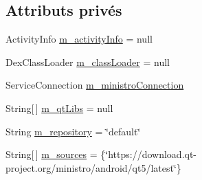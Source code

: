 \subsection*{Attributs privés}
\begin{DoxyCompactItemize}
\item 
Activity\-Info \hyperlink{classorg_1_1qtproject_1_1qt5_1_1android_1_1bindings_1_1_qt_activity_ab82e3c0917844afbd0559863f78137bf}{m\-\_\-activity\-Info} = null
\item 
Dex\-Class\-Loader \hyperlink{classorg_1_1qtproject_1_1qt5_1_1android_1_1bindings_1_1_qt_activity_a061ee56178d4d7ab6da01d7cf187e33b}{m\-\_\-class\-Loader} = null
\item 
Service\-Connection \hyperlink{classorg_1_1qtproject_1_1qt5_1_1android_1_1bindings_1_1_qt_activity_a26f7868b5d490d58265090a167e66436}{m\-\_\-ministro\-Connection}
\item 
String\mbox{[}$\,$\mbox{]} \hyperlink{classorg_1_1qtproject_1_1qt5_1_1android_1_1bindings_1_1_qt_activity_a18de4caf09f5386072f13afc426f2bce}{m\-\_\-qt\-Libs} = null
\item 
String \hyperlink{classorg_1_1qtproject_1_1qt5_1_1android_1_1bindings_1_1_qt_activity_a45d1a455c3855079063f6457a9dffb82}{m\-\_\-repository} = \char`\"{}default\char`\"{}
\item 
String\mbox{[}$\,$\mbox{]} \hyperlink{classorg_1_1qtproject_1_1qt5_1_1android_1_1bindings_1_1_qt_activity_a9cb36331162103703e5861eae9ce2caa}{m\-\_\-sources} = \{\char`\"{}https\-://download.\-qt-\/project.\-org/ministro/android/qt5/latest\char`\"{}\}
\end{DoxyCompactItemize}
